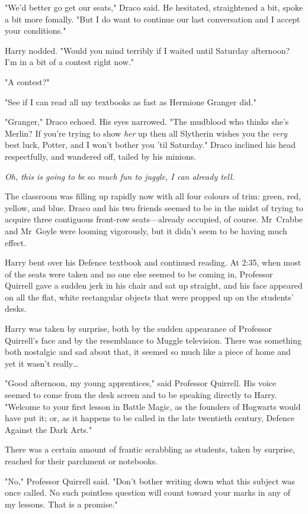 "We’d better go get our seats," Draco said. He hesitated, straightened a bit,
spoke a bit more fomally. "But I do want to continue our last conversation and
I accept your conditions."

Harry nodded. "Would you mind terribly if I waited until Saturday afternoon?
I’m in a bit of a contest right now."

"A contest?"

"See if I can read all my textbooks as fast as Hermione Granger did."

"Granger," Draco echoed. His eyes narrowed. "The mudblood who thinks she’s
Merlin? If you’re trying to show \emph{her} up then all Slytherin wishes you
the \emph{very} best luck, Potter, and I won’t bother you ’til Saturday." Draco
inclined his head respectfully, and wandered off, tailed by his minions.

\emph{Oh, this is going to be} so \emph{much fun to juggle, I can already tell.}

The classroom was filling up rapidly now with all four colours of trim: green,
red, yellow, and blue. Draco and his two friends seemed to be in the midst of
trying to acquire three contiguous front-row seats—already occupied, of
course. Mr~Crabbe and Mr~Goyle were looming vigorously, but it didn’t seem to
be having much effect.

Harry bent over his Defence textbook and continued reading.
\later
At 2:35\PM, when most of the seats were taken and no one else seemed to be
coming in, Professor Quirrell gave a sudden jerk in his chair and sat up
straight, and his face appeared on all the flat, white rectangular objects that
were propped up on the students’ desks.

Harry was taken by surprise, both by the sudden appearance of Professor
Quirrell’s face and by the resemblance to Muggle television. There was
something both nostalgic and sad about that, it seemed so much like a piece of
home and yet it wasn’t really…

"Good afternoon, my young apprentices," said Professor Quirrell. His voice
seemed to come from the desk screen and to be speaking directly to Harry.
"Welcome to your first lesson in Battle Magic, as the founders of Hogwarts
would have put it; or, as it happens to be called in the late twentieth
century, Defence Against the Dark Arts."

There was a certain amount of frantic scrabbling as students, taken by
surprise, reached for their parchment or notebooks.

"No," Professor Quirrell said. "Don’t bother writing down what this subject was
once called. No such pointless question will count toward your marks in any of
my lessons. That is a promise."

